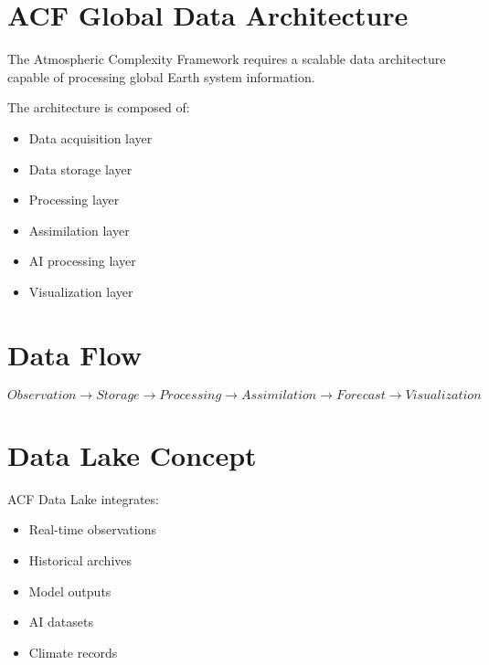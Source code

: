 \section{ACF Global Data Architecture}


The Atmospheric Complexity Framework requires a scalable data
architecture capable of processing global Earth system information.


The architecture is composed of:


\begin{itemize}

\item Data acquisition layer

\item Data storage layer

\item Processing layer

\item Assimilation layer

\item AI processing layer

\item Visualization layer

\end{itemize}



\section{Data Flow}


\begin{equation}
Observation
\rightarrow
Storage
\rightarrow
Processing
\rightarrow
Assimilation
\rightarrow
Forecast
\rightarrow
Visualization
\end{equation}



\section{Data Lake Concept}


ACF Data Lake integrates:


\begin{itemize}

\item Real-time observations

\item Historical archives

\item Model outputs

\item AI datasets

\item Climate records

\end{itemize}

